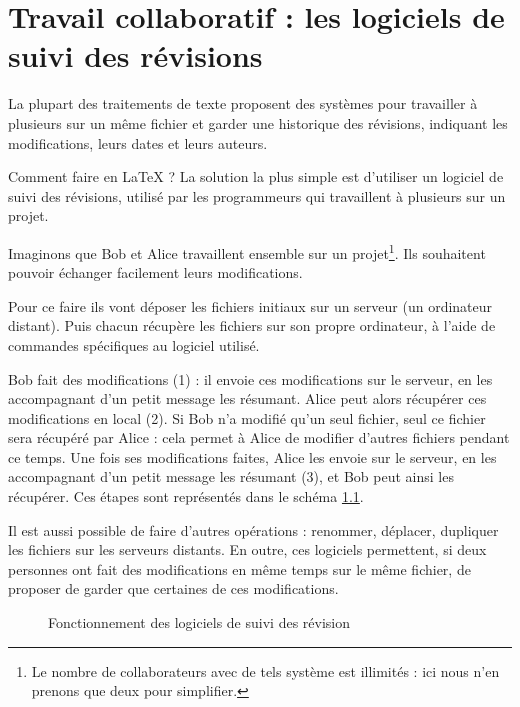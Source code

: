 \chapter{Travail collaboratif : les logiciels de suivi des révisions}	%

\begin{prealable}
	La plupart des traitements de texte proposent des systèmes pour travailler à plusieurs sur un même fichier et garder une historique des révisions, indiquant les modifications, leurs dates et leurs auteurs. 
	
	Comment faire en \LaTeX{} ? La solution la plus simple est d'utiliser un logiciel de suivi des révisions, utilisé par les programmeurs qui travaillent à plusieurs sur un projet.
\end{prealable}

Imaginons que Bob et Alice travaillent ensemble sur un projet\footnote{Le nombre de collaborateurs avec de tels système est illimités : ici nous n'en prenons que deux pour simplifier.}. Ils souhaitent pouvoir échanger facilement leurs modifications.

Pour ce faire ils vont déposer les fichiers initiaux sur un serveur (un ordinateur distant). Puis chacun récupère les fichiers sur son propre ordinateur, à l'aide de commandes spécifiques au logiciel utilisé.

Bob fait des modifications (1) : il envoie ces modifications sur le serveur, en les accompagnant d'un petit message les résumant. Alice peut alors récupérer ces modifications en local (2). Si Bob n'a modifié qu'un seul fichier, seul ce fichier sera récupéré par Alice : cela permet à Alice de modifier d'autres fichiers pendant ce temps. Une fois ses modifications faites, Alice les envoie sur le serveur, en les accompagnant d'un petit message les résumant (3), et Bob peut ainsi les récupérer. Ces étapes sont représentés dans le schéma \ref{svn}.

Il est aussi possible de faire d'autres opérations : renommer, déplacer, dupliquer les fichiers sur les serveurs distants. En outre, ces logiciels permettent, si deux personnes ont fait des modifications en même temps sur le même fichier, de proposer de garder que certaines de ces modifications.

\begin{figure}[ht]
\centering

\caption{Fonctionnement des logiciels de suivi des révision}\label{svn}
\end{figure}

